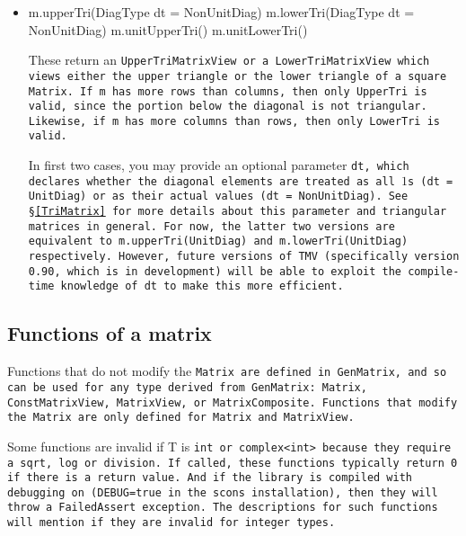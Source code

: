 \begin{itemize}
\item
\begin{tmvcode}
m.upperTri(DiagType dt = NonUnitDiag)
m.lowerTri(DiagType dt = NonUnitDiag)
m.unitUpperTri()
m.unitLowerTri()
\end{tmvcode}
These return an \tt{UpperTriMatrixView} or a \tt{LowerTriMatrixView} which
views either the upper triangle or the lower triangle of a square \tt{Matrix}.
If \tt{m} has more rows than columns, then only \tt{UpperTri} is valid, since
the portion below the diagonal is not triangular.
Likewise, if \tt{m} has more columns than rows, then only \tt{LowerTri} is valid.

In first two cases, you may provide an optional parameter \tt{dt}, which
declares whether the diagonal elements are treated as all $1$s
(\tt{dt = UnitDiag}) or as their actual values (\tt{dt = NonUnitDiag}). 
See \S\ref{TriMatrix} for more details about this parameter and
triangular matrices in general.
For now, the latter two versions are equivalent to \tt{m.upperTri(UnitDiag)} and 
\tt{m.lowerTri(UnitDiag)} respectively.  However, future versions of TMV
(specifically version 0.90, which is in development) will be able to exploit
the compile-time knowledge of \tt{dt} to make this more efficient.

\end{itemize}

\subsection{Functions of a matrix}
\label{Matrix_Functions}

Functions that do not modify the \tt{Matrix} are defined in 
\tt{GenMatrix}, and so can be used for any type derived from \tt{GenMatrix}:
\tt{Matrix}, \tt{ConstMatrixView}, \tt{MatrixView}, or \tt{MatrixComposite}.
Functions that modify the \tt{Matrix} are only defined for 
\tt{Matrix} and \tt{MatrixView}.

Some functions are invalid if T is \tt{int} or \tt{complex<int>} because they require 
a \tt{sqrt}, \tt{log} or division.  If called, these functions typically return \tt{0} if there is a return value.
And if the library is compiled with debugging on (\tt{DEBUG=true} in the scons installation),
then they will throw a \tt{FailedAssert} exception.  The descriptions for such functions
will mention if they are invalid for integer types.

